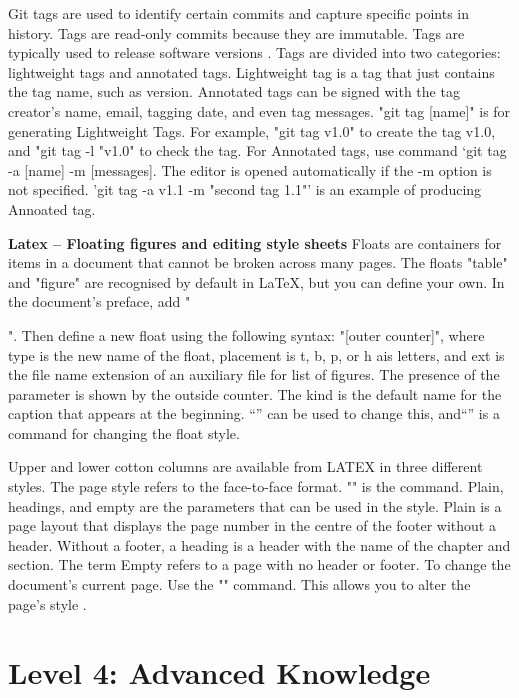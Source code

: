 \documentclass[a4paper, 11pt]{report}
\begin{document}
Git tags are used to identify certain commits and capture specific points in history. Tags are read-only commits because they are immutable. Tags are typically used to release software versions \cite{patty1}. Tags are divided into two categories: lightweight tags and annotated tags. Lightweight tag is a tag that just contains the tag name, such as version. Annotated tags can be signed with the tag creator's name, email, tagging date, and even tag messages.
"git tag [name]" is for generating Lightweight Tags. For example, "git tag v1.0" to create the tag v1.0, and "git tag -l "v1.0" to check the tag. For Annotated tags, use command ‘git tag -a [name] -m [messages]. The editor is opened automatically if the -m option is not specified. 'git tag -a v1.1 -m "second tag 1.1"' is an example of producing Annoated tag.


\textbf{Latex – Floating figures and editing style sheets}
Floats are containers for items in a document that cannot be broken across many pages. The floats "table" and "figure" are recognised by default in LaTeX, but you can define your own. In the document's preface, add "\usepackage{float}". Then define a new float using the following syntax: "[outer counter]", where type is the new name of the float, placement is t, b, p, or h ais letters, and ext is the file name extension of an auxiliary file for list of figures. The presence of the parameter is shown by the outside counter. The kind is the default name for the caption that appears at the beginning. “” can be used to change this, and“\thispagestyle” is a command for changing the float style.

Upper and lower cotton columns are available from LATEX in three different styles. The page style refers to the face-to-face format. "\pagestyle{style}" is the command. Plain, headings, and empty are the parameters that can be used in the style. Plain is a page layout that displays the page number in the centre of the footer without a header. Without a footer, a heading is a header with the name of the chapter and section. The term Empty refers to a page with no header or footer. To change the document's current page. Use the "" command. This allows you to alter the page's style \cite{patty}.





\newpage
\section{Level 4: Advanced Knowledge}
\end{document}
